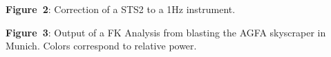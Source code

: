 \documentclass[final]{lmuposter}
\begin{document}
\begin{multicols}{2}
{\begin{multicols}{2}
\columnbreak
\begin{center}
	{\small
	\textbf{Figure~2}: Correction of a STS2 to a 1Hz instrument.
	} \\[.5\MyBoxVSep]
\end{center}

\begin{center}
	{\small
	\textbf{Figure~3}: Output of a FK Analysis from blasting the AGFA skyscraper in Munich. Colors correspond to relative power.
	} \\[.5\MyBoxVSep]
\end{center}


\end{multicols}}
\end{multicols}
\end{document}
